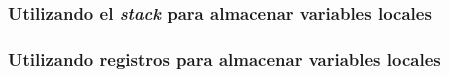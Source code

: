 \documentclass[a4paper]{article}
\begin{document}
\subsubsection{Utilizando el \textit{stack} para almacenar variables locales}
\label{sec:cod_asm}


\pagebreak
\subsubsection{Utilizando registros para almacenar variables locales}
\label{sec:cod_asm_r}

\end{document}
